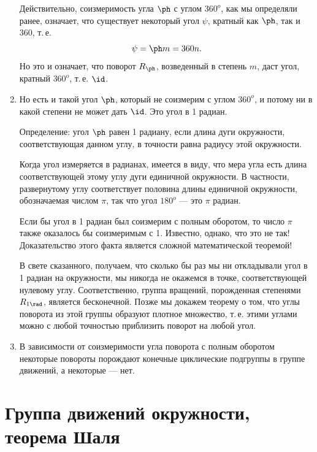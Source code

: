 \begin{enumerate}
Действительно, соизмеримость угла $\ph$ с углом $360^o$, как мы определяли ранее, означает, что существует некоторый угол $\psi$, кратный как $\ph$, так и $360$, т.\,е.
$$
\psi = \ph m = 360n.
$$
Но это и означает, что поворот $R_\ph$, возведенный в степень $m$, даст угол, кратный $360^o$, т.\,е. $\id$.

\item Но есть и такой угол $\ph$, который не соизмерим с углом $360^o$, и потому ни в какой степени не может дать $\id$. Это угол в 1 радиан.

Определение: угол $\ph$ равен 1 радиану, если длина дуги окружности, соответствующая данном углу, в точности равна радиусу этой окружности.

Когда угол измеряется в радианах, имеется в виду, что мера угла есть длина соответствующей этому углу дуги единичной окружности. В частности, развернутому углу соответствует половина длины единичной окружности, обозначаемая числом $\pi$, так что угол $180^o$ --- это $\pi$ радиан.

Если бы угол в 1 радиан был соизмерим с полным оборотом, то число $\pi$ также оказалось бы соизмеримым с 1. Известно, однако, что это не так! Доказательство этого факта является сложной математической теоремой!

В свете сказанного, получаем, что сколько бы раз мы ни откладывали угол в 1 радиан на окружности, мы никогда не окажемся в точке, соответствующей нулевому углу. Соответственно, группа вращений, порожденная степенями $R_{1\rad}$, является бесконечной. Позже мы докажем теорему о том, что углы поворота из этой группы образуют плотное множество, т.\,е. этими углами можно с любой точностью приблизить поворот на любой угол.

\item В зависимости от соизмеримости угла поворота с полным оборотом некоторые повороты порождают конечные циклические подгруппы в группе движений, а некоторые --- нет.
\end{enumerate}


\section{Группа движений окружности, теорема Шаля}\label{CircleGroup}


